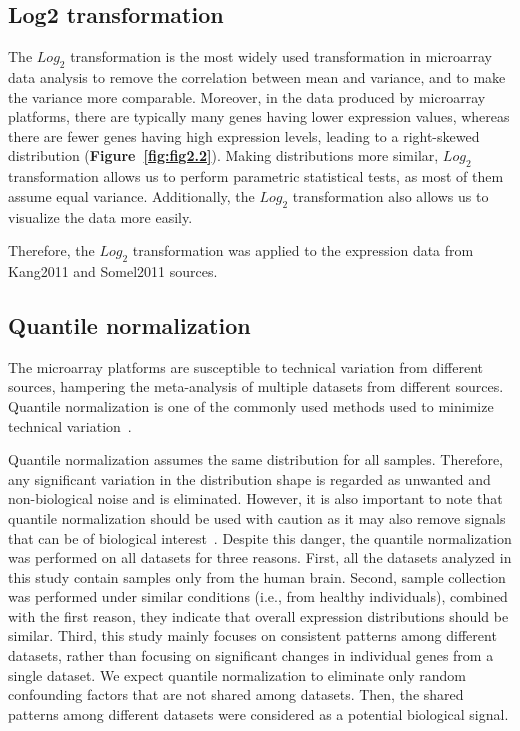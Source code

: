 \subsection{Log2 transformation}

The $Log_2$ transformation is the most widely used transformation in microarray data analysis
to remove the correlation between mean and variance, and to make the variance more comparable.
Moreover, in the data produced by microarray platforms, there are typically many genes having lower expression values, 
whereas there are fewer genes having high expression levels,
leading to a right-skewed distribution (\textbf{Figure~\ref{fig:fig2.2}}).
Making distributions more similar, $Log_2$ transformation allows us to perform parametric statistical tests, as most of them assume equal variance. 
Additionally, the $Log_2$ transformation also allows us to visualize the data more easily.

Therefore, the $Log_2$ transformation was applied to the expression data from Kang2011 and Somel2011 sources.

\subsection{Quantile normalization}
The microarray platforms are susceptible to technical variation from different sources, hampering the meta-analysis of multiple datasets from different sources.
Quantile normalization is one of the commonly used methods used to minimize technical variation~\autocite{Zhao2020}. 

Quantile normalization assumes the same distribution for all samples. 
Therefore, any significant variation in the distribution shape is regarded as unwanted and non-biological noise and is eliminated.
However, it is also important to note that quantile normalization should be used with caution as it may also remove signals that can be of biological interest~\autocite{Hicks2014}.
Despite this danger, the quantile normalization was performed on all datasets for three reasons. 
First, all the datasets analyzed in this study contain samples only from the human brain.
Second, sample collection was performed under similar conditions (i.e., from healthy individuals), combined with the first reason, they indicate that overall expression distributions should be similar.
Third, this study mainly focuses on consistent patterns among different datasets, rather than focusing on significant changes in individual genes from a single dataset.
We expect quantile normalization to eliminate only random confounding factors that are not shared among datasets. 
Then, the shared patterns among different datasets were considered as a potential biological signal.

